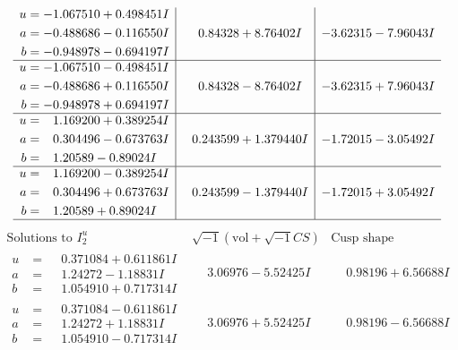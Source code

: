 \documentclass[1p]{elsarticle_modified}
\theoremstyle{definition}
\newcommand{\I}{\sqrt{-1}}
\begin{document}
$$\begin{array}{c|c|c}
\begin{aligned}
u &= -1.067510 + 0.498451 I \\
a &= -0.488686 - 0.116550 I \\
b &= -0.948978 - 0.694197 I\end{aligned}
 & \phantom{-}0.84328 + 8.76402 I & -3.62315 - 7.96043 I \\ \hline\begin{aligned}
u &= -1.067510 - 0.498451 I \\
a &= -0.488686 + 0.116550 I \\
b &= -0.948978 + 0.694197 I\end{aligned}
 & \phantom{-}0.84328 - 8.76402 I & -3.62315 + 7.96043 I \\ \hline\begin{aligned}
u &= \phantom{-}1.169200 + 0.389254 I \\
a &= \phantom{-}0.304496 - 0.673763 I \\
b &= \phantom{-}1.20589 - 0.89024 I\end{aligned}
 & \phantom{-}0.243599 + 1.379440 I & -1.72015 - 3.05492 I \\ \hline\begin{aligned}
u &= \phantom{-}1.169200 - 0.389254 I \\
a &= \phantom{-}0.304496 + 0.673763 I \\
b &= \phantom{-}1.20589 + 0.89024 I\end{aligned}
 & \phantom{-}0.243599 - 1.379440 I & -1.72015 + 3.05492 I\\
 \hline 
 \end{array}$$\newpage$$\begin{array}{c|c|c}  
\text{Solutions to }I^u_{2}& \I (\text{vol} + \sqrt{-1}CS) & \text{Cusp shape}\\
 \hline 
\begin{aligned}
u &= \phantom{-}0.371084 + 0.611861 I \\
a &= \phantom{-}1.24272 - 1.18831 I \\
b &= \phantom{-}1.054910 + 0.717314 I\end{aligned}
 & \phantom{-}3.06976 - 5.52425 I & \phantom{-}0.98196 + 6.56688 I \\ \hline\begin{aligned}
u &= \phantom{-}0.371084 - 0.611861 I \\
a &= \phantom{-}1.24272 + 1.18831 I \\
b &= \phantom{-}1.054910 - 0.717314 I\end{aligned}
 & \phantom{-}3.06976 + 5.52425 I & \phantom{-}0.98196 - 6.56688 I \\ \hline\begin{aligned}

\end{aligned}
\end{array}$$
\end{document}
